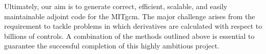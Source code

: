 \documentclass[11pt]{article}
\begin{document}
Ultimately, our aim is to generate correct, efficient, scalable, and easily 
maintainable adjoint code for the MITgcm. The major challenge arises from the
requirement to tackle problems in which derivatives are calculated with respect 
to billions of controls. A combination of the methods outlined above is 
essential to guarantee the successful completion of this highly ambitious
project.

%




\end{document}
